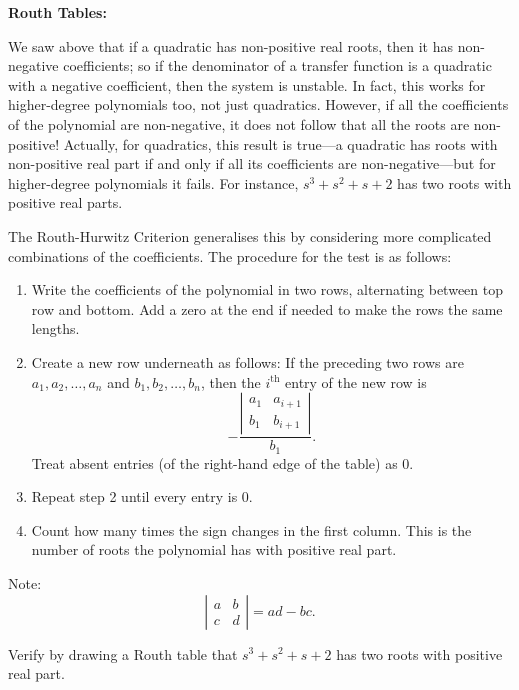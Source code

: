 \documentclass{article}
\begin{document}
\clearpage



\textbf{Routh Tables:}\bigskip


We saw above that if a quadratic has non-positive real roots, then it has non-negative coefficients; so if the denominator of a transfer function is a quadratic with a negative coefficient, then the system is unstable. In fact, this works for higher-degree polynomials too, not just quadratics. However, if all the coefficients of the polynomial are non-negative, it does not follow that all the roots are non-positive! Actually, for quadratics, this result is true---a quadratic has roots with non-positive real part if and only if all its coefficients are non-negative---but for higher-degree polynomials it fails. For instance, $s^3+s^2+s+2$ has two roots with positive real parts.

The Routh-Hurwitz Criterion generalises this by considering more complicated combinations of the coefficients. The procedure for the test is as follows:

\begin{enumerate}
	\item Write the coefficients of the polynomial in two rows, alternating between top row and bottom. Add a zero at the end if needed to make the rows the same lengths.
	\item Create a new row underneath as follows: If the preceding two rows are $a_1,a_2,\hdots,a_n$ and $b_1,b_2,\hdots,b_n$, then the $i^\mathrm{th}$ entry of the new row is
		\[-\frac{\left|\begin{array}{cc}a_1 & a_{i+1}\\ b_1& b_{i+1}\end{array}\right|}{b_1}.\]
		Treat absent entries (of the right-hand edge of the table) as 0.
	\item Repeat step 2 until every entry is 0.
	\item Count how many times the sign changes in the first column. This is the number of roots the polynomial has with positive real part.
\end{enumerate}

Note:
	\[\left|\begin{array}{cc}a&b\\c&d\end{array}\right|=ad-bc.\]


\bigskip


Verify by drawing a Routh table that $s^3+s^2+s+2$ has two roots with positive real part.
\end{document}
